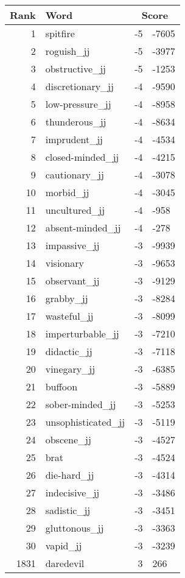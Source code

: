 \begin{longtable}[!htbp]{| rlr@{.}l |}
    \hline
    \textbf{Rank} & \textbf{Word} & \multicolumn{2}{c|}{\textbf{Score}} \\
    \hline
    \endhead
    1 & spitfire & -5 & -7605 \\
    2 & roguish\_jj & -5 & -3977 \\
    3 & obstructive\_jj & -5 & -1253 \\
    4 & discretionary\_jj & -4 & -9590 \\
    5 & low-pressure\_jj & -4 & -8958 \\
    6 & thunderous\_jj & -4 & -8634 \\
    7 & imprudent\_jj & -4 & -4534 \\
    8 & closed-minded\_jj & -4 & -4215 \\
    9 & cautionary\_jj & -4 & -3078 \\
    10 & morbid\_jj & -4 & -3045 \\
    11 & uncultured\_jj & -4 & -958 \\
    12 & absent-minded\_jj & -4 & -278 \\
    13 & impassive\_jj & -3 & -9939 \\
    14 & visionary & -3 & -9653 \\
    15 & observant\_jj & -3 & -9129 \\
    16 & grabby\_jj & -3 & -8284 \\
    17 & wasteful\_jj & -3 & -8099 \\
    18 & imperturbable\_jj & -3 & -7210 \\
    19 & didactic\_jj & -3 & -7118 \\
    20 & vinegary\_jj & -3 & -6385 \\
    21 & buffoon & -3 & -5889 \\
    22 & sober-minded\_jj & -3 & -5253 \\
    23 & unsophisticated\_jj & -3 & -5119 \\
    24 & obscene\_jj & -3 & -4527 \\
    25 & brat & -3 & -4524 \\
    26 & die-hard\_jj & -3 & -4314 \\
    27 & indecisive\_jj & -3 & -3486 \\
    28 & sadistic\_jj & -3 & -3451 \\
    29 & gluttonous\_jj & -3 & -3363 \\
    30 & vapid\_jj & -3 & -3239 \\
    1831 & daredevil & 3 & 266 \\

\end{longtable}
